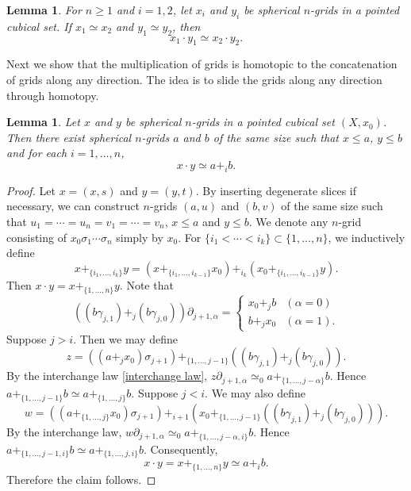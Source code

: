 \documentclass[oneside, 12pt]{amsart}
\numberwithin{equation}{section}
\theoremstyle{plain}
\newtheorem{lemma}[theorem]{Lemma}
\theoremstyle{definition}
\theoremstyle{remark}
\begin{document}
	
	
	\begin{lemma}
		\label{grid product}
		For $n\ge 1$ and $i=1,2$, let $x_i$ and $y_i$ be spherical $n$-grids in a pointed cubical set. If $x_1\simeq x_2$ and $y_1\simeq y_2$, then
		\[
		x_1\cdot y_1\simeq x_2\cdot y_2.
		\]
	\end{lemma}
	
	
	Next we show that the multiplication of grids is homotopic to the concatenation of grids along any direction. The idea is to slide the grids along any direction through homotopy.
	\begin{lemma}
		\label{grid slide}
		Let $x$ and $y$ be spherical $n$-grids in a pointed cubical set $(X,x_0)$. Then there exist spherical $n$-grids $a$ and $b$ of the same size such that $x\le a$, $y\le b$ and for each $i=1,\ldots,n$,
		\[
		x\cdot y\simeq a+_ib.
		\]
	\end{lemma}
	
	\begin{proof}
		Let $x=(x,s)$ and $y=(y,t)$. By inserting degenerate slices if necessary, we can construct $n$-grids $(a,u)$ and $(b,v)$ of the same size such that $u_1=\cdots=u_n=v_1=\cdots=v_n$, $x\le a$ and $y\le b$. We denote any $n$-grid consisting of $x_0\sigma_{1}\cdots\sigma_{n}$ simply by $x_0$. For $\{i_1<\cdots<i_k\}\subset\{1,\ldots,n\}$, we inductively define
		\[
		x+_{\{i_1,\ldots,i_k\}}y=(x+_{\{i_1,\ldots,i_{k-1}\}}x_0)+_{i_k}(x_0+_{\{i_1,\ldots,i_{k-1}\}}y).
		\]
		Then $x\cdot y=x+_{\{1,\ldots,n\}}y$. Note that
		\[
		((b\gamma_{j,1})+_j(b\gamma_{j,0}))\partial_{j+1,\alpha}=
		\begin{cases}
			x_0+_jb&(\alpha=0)\\
			b+_jx_0&(\alpha=1).
		\end{cases}
		\]
		Suppose $j>i$. Then we may define
		\[
		z=((a+_jx_0)\sigma_{j+1})+_{\{1,\ldots,j-1\}}((b\gamma_{j,1})+_j(b\gamma_{j,0})).
		\]
		By the interchange law \eqref{interchange law}, $z\partial_{j+1,\alpha}\simeq_0a+_{\{1,\ldots,j-\alpha\}}b$. Hence $a+_{\{1,\ldots,j-1\}}b\simeq a+_{\{1,\ldots,j\}}b$. Suppose $j<i$. We may also define
		\[
		w=((a+_{\{1,\ldots,j\}}x_0)\sigma_{j+1})+_{i+1}(x_0+_{\{1,\ldots,j-1\}}((b\gamma_{j,1})+_j(b\gamma_{j,0}))).
		\]
		By the interchange law, $w\partial_{j+1,\alpha}\simeq_0a+_{\{1,\ldots,j-\alpha,i\}}b$. Hence $a+_{\{1,\ldots,j-1,i\}}b\simeq a+_{\{1,\ldots,j,i\}}b$. Consequently,
		\[
		x\cdot y=x+_{\{1,\ldots,n\}}y\simeq a+_ib.
		\]
		Therefore the claim follows.
	\end{proof}
	
\end{document}
